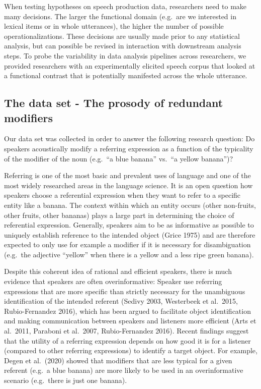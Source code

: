 \documentclass[
  english,
  man]{apa6}
\begin{document}
When testing hypotheses on speech production data, researchers need to make many decisions. The larger the functional domain (e.g.~are we interested in lexical items or in whole utterances), the higher the number of possible operationalizations. These decisions are usually made prior to any statistical analysis, but can possible be revised in interaction with downstream analysis steps. To probe the variability in data analysis pipelines across researchers, we provided researchers with an experimentally elicited speech corpus that looked at a functional contrast that is potentially manifested across the whole utterance.

\hypertarget{the-data-set---the-prosody-of-redundant-modifiers}{%
\subsection{The data set - The prosody of redundant modifiers}\label{the-data-set---the-prosody-of-redundant-modifiers}}

Our data set was collected in order to answer the following research question: Do speakers acoustically modify a referring expression as a function of the typicality of the modifier of the noun (e.g.~\enquote{a blue banana} vs.~\enquote{a yellow banana})?

Referring is one of the most basic and prevalent uses of language and one of the most widely researched areas in the language science. It is an open question how speakers choose a referential expression when they want to refer to a specific entity like a banana. The context within which an entity occurs (other non-fruits, other fruits, other bananas) plays a large part in determining the choice of referential expression. Generally, speakers aim to be as informative as possible to uniquely establish reference to the intended object (Grice 1975) and are therefore expected to only use for example a modifier if it is necessary for disambiguation (e.g.~the adjective \enquote{yellow} when there is a yellow and a less ripe green banana).

Despite this coherent idea of rational and efficient speakers, there is much evidence that speakers are often overinformative: Speaker use referring expressions that are more specific than strictly necessary for the unambiguous identification of the intended referent (Sedivy 2003, Westerbeek et al.~2015, Rubio-Fernandez 2016), which has been argued to facilitate object identification and making communication between speakers and listeners more efficient (Arts et al.~2011, Paraboni et al.~2007, Rubio-Fernandez 2016). Recent findings suggest that the utility of a referring expression depends on how good it is for a listener (compared to other referring expressions) to identify a target object. For example, Degen et al.~(2020) showed that modifiers that are less typical for a given referent (e.g.~a blue banana) are more likely to be used in an overinformative scenario (e.g.~there is just one banana).
\end{document}
